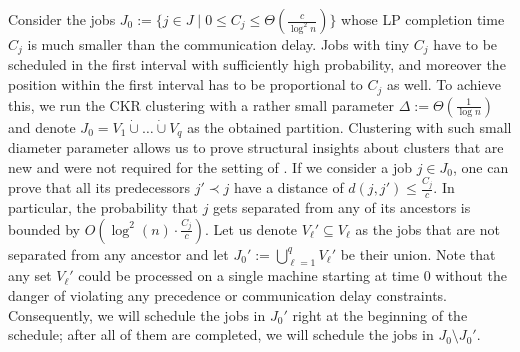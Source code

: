   Consider the jobs $J_0 := \{ j \in J \mid 0 \leq C_j \leq \Theta(\frac{c}{\log^2 n}) \}$ whose LP completion time $C_j$ is much smaller than the communication delay. Jobs with tiny $C_j$ have to be scheduled in the first interval with sufficiently high probability, and moreover the position within the first interval has to be proportional to $C_j$ as well.
  To achieve this, we run the CKR clustering with a rather small parameter $\Delta := \Theta(\frac{1}{\log n})$ and denote $J_0 = V_1 \dot{\cup} \ldots \dot{\cup} V_q$ as the obtained partition. Clustering with such small diameter parameter allows us to prove structural insights about clusters that are new and were not required for the setting of \cite{DKRTZ20}.
  If we consider a job $j \in J_0$, one can prove that all its predecessors $j' \prec j$ have a distance of $d(j,j') \leq \frac{C_j}{c}$. In particular, the probability that $j$ gets separated from any of its ancestors is bounded by $O(\log^2(n) \cdot \frac{C_j}{c})$. Let us denote $V_{\ell}' \subseteq V_{\ell}$ as the jobs that are not separated from any ancestor and let $J_0' := \bigcup_{\ell=1}^q V_{\ell}'$ be their union. Note that any set $V_{\ell}'$ could be processed on a single machine starting at time $0$ without the danger of violating any precedence or communication delay constraints.
  Consequently, we will schedule the jobs in $J_0'$ right at the beginning of the schedule; after all of them are completed, we will schedule  the jobs in $J_0 \setminus J_0'$.
